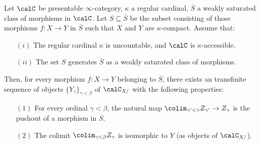 \begin{proposition}\label{easycrust}
Let $\calC$ be presentable $\infty$-category, $\kappa$ a regular cardinal, $\overline{S}$ a weakly saturated class of morphisms in $\calC$. Let $S \subseteq \overline{S}$ be the subset consisting of those morphisms $f: X \rightarrow Y$ in $\overline{S}$ such that $X$ and $Y$ are $\kappa$-compact. Assume that:
\begin{itemize}
\item[$(i)$] The regular cardinal $\kappa$ is uncountable, and $\calC$ is $\kappa$-accessible.
\item[$(ii)$] The set $S$ generates $\overline{S}$ as a weakly saturated class of morphisms.
\end{itemize}
Then, for every morphism $f: X \rightarrow Y$ belonging to $\overline{S}$, there
exists an transfinite sequence of objects $\{ Y_{\gamma} \}_{\gamma < \beta}$ of
$\calC_{X/}$ with the following properties:
\begin{itemize}
\item[$(1)$] For every ordinal $\gamma < \beta$, the natural map
$\colim_{\gamma' < \gamma} Z_{\gamma'} \rightarrow Z_{\gamma}$ is the pushout of a morphism in  $S$.
\item[$(2)$] The colimit $\colim_{\gamma < \beta} Z_{\gamma}$ is isomorphic to $Y$
(as objects of $\calC_{X/}$). 
\end{itemize}
\end{proposition}

